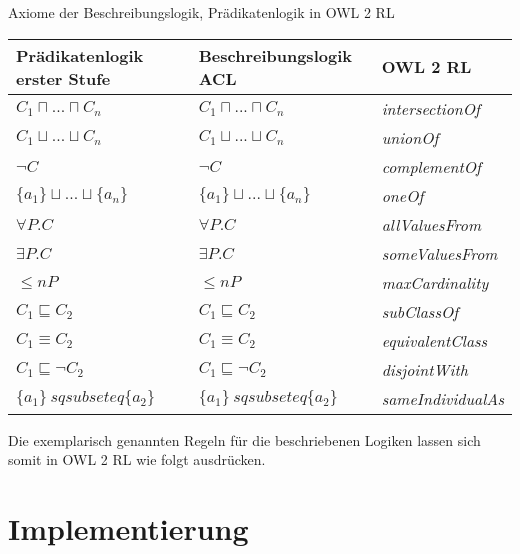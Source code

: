 \documentclass[runningheads,a4paper]{llncs}
\begin{document}
Axiome der Beschreibungslogik, Prädikatenlogik in OWL 2 RL
\begin{table}[h]
\begin{tabular}{|l|l|l|}
\hline
Prädikatenlogik erster Stufe & Beschreibungslogik ACL & OWL 2 RL \\ \hline
$ C_1 \sqcap ... \sqcap C_n $ & $ C_1 \sqcap ... \sqcap C_n $ & \textit{intersectionOf} \\ \hline
$ C_1 \sqcup ... \sqcup C_n $ & $ C_1 \sqcup ... \sqcup C_n $ & \textit{unionOf} \\ \hline
$ \neg C $ & $ \neg C $ & \textit{complementOf} \\ \hline
$ \{a_1\} \sqcup ... \sqcup \{a_n\} $ & $ \{a_1\} \sqcup ... \sqcup \{a_n\} $ & \textit{oneOf} \\ \hline
$ \forall P.C $ & $ \forall P.C $ & \textit{allValuesFrom} \\ \hline
$ \exists P.C $ & $ \exists P.C $ & \textit{someValuesFrom} \\ \hline
$ \leq n P $ & $ \leq n P $ & \textit{maxCardinality} \\ \hline
$ C_1 \sqsubseteq C_2 $ & $ C_1 \sqsubseteq C_2 $ & \textit{subClassOf} \\ \hline
$ C_1 \equiv C_2 $ & $ C_1 \equiv C_2 $ & \textit{equivalentClass} \\ \hline
$ C_1 \sqsubseteq \neg C_2 $ & $ C_1 \sqsubseteq \neg C_2 $ & \textit{disjointWith} \\ \hline
$ \{a_1\} \ sqsubseteq \{a_2\} $ & $ \{a_1\} \ sqsubseteq \{a_2\} $ & \textit{sameIndividualAs} \\ \hline
\end{tabular}
\end{table}

Die exemplarisch genannten Regeln für die beschriebenen Logiken lassen sich somit in OWL 2 RL wie folgt ausdrücken.









\section{Implementierung}
\end{document}
